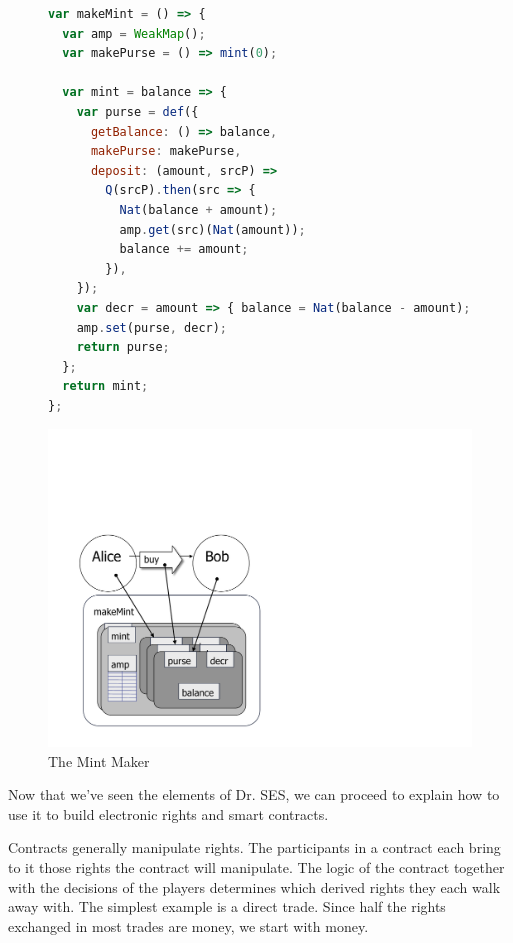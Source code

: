 \documentclass{llncs}
\begin{document}
\begin{figure}[t]
\begin{minipage}[t]{0.48\linewidth}
\begin{lstlisting}[language=javascript]
var makeMint = () => {
  var amp = WeakMap();
  var makePurse = () => mint(0);
  
  var mint = balance => {
    var purse = def({
      getBalance: () => balance,
      makePurse: makePurse,
      deposit: (amount, srcP) =>
        Q(srcP).then(src => {
          Nat(balance + amount);
          amp.get(src)(Nat(amount)); 
          balance += amount;
        }),
    });
    var decr = amount => { balance = Nat(balance - amount); };
    amp.set(purse, decr);
    return purse;
  };
  return mint;
};
\end{lstlisting}
\end{minipage}
\begin{minipage}[t]{0.48\linewidth}
\vspace{0pt}
\includegraphics[scale=0.3]{bw-mint.pdf}
\end{minipage}
\caption{The Mint Maker}
\label{makeMint}
\end{figure}

Now that we've seen the elements of Dr. SES, we can proceed to explain how to use it to build electronic rights and smart contracts.

Contracts generally manipulate rights. The participants in a contract each bring to it those rights the contract will manipulate. The logic of the contract together with the decisions of the players determines which derived rights they each walk away with. The simplest example is a direct trade. Since half the rights exchanged in most trades are money, we start with money. 
\end{document}
